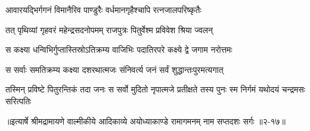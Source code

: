 \twolineshloka
{आवारयद्भिर्गगनं विमानैरिव पाण्डुरैः}
{वर्धमानगृहैश्चापि रत्नजालपरिष्कृतैः} %

\twolineshloka
{तत् पृथिव्यां गृहवरं महेन्द्रसदनोपमम्}
{राजपुत्रः पितुर्वेश्म प्रविवेश श्रिया ज्वलन्} %

\twolineshloka
{स कक्ष्या धन्विभिर्गुप्तास्तिस्रोऽतिक्रम्य वाजिभिः}
{पदातिरपरे कक्ष्ये द्वे जगाम नरोत्तमः} %

\twolineshloka
{स सर्वाः समतिक्रम्य कक्ष्या दशरथात्मजः}
{संनिवर्त्य जनं सर्वं शुद्धान्तःपुरमत्यगात्} %

\twolineshloka
{तस्मिन् प्रविष्टे पितुरन्तिकं तदा जनः स सर्वो मुदितो नृपात्मजे}
{प्रतीक्षते तस्य पुनः स्म निर्गमं यथोदयं चन्द्रमसः सरित्पतिः} %


॥इत्यार्षे श्रीमद्रामायणे वाल्मीकीये आदिकाव्ये अयोध्याकाण्डे रामागमनम् नाम सप्तदशः सर्गः ॥२-१७॥
